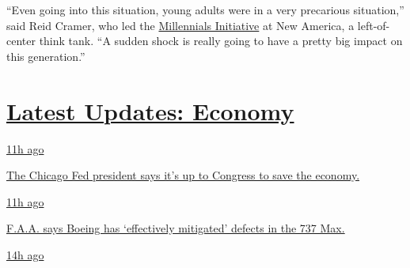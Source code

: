 ``Even going into this situation, young adults were in a very precarious
situation,'' said Reid Cramer, who led the
\href{https://www.newamerica.org/millennials/reports/emerging-millennial-wealth-gap/the-emerging-millennial-wealth-gap-opening-note/}{Millennials
Initiative} at New America, a left-of-center think tank. ``A sudden
shock is really going to have a pretty big impact on this generation.''

\hypertarget{latest-updates-economy}{%
\section{\texorpdfstring{\href{https://www.nytimes3xbfgragh.onion/live/2020/08/03/business/stock-market-today-coronavirus?action=click\&pgtype=Article\&state=default\&region=MAIN_CONTENT_1\&context=storylines_live_updates}{Latest
Updates:
Economy}}{Latest Updates: Economy}}\label{latest-updates-economy}}

\href{https://www.nytimes3xbfgragh.onion/live/2020/08/03/business/stock-market-today-coronavirus?action=click\&pgtype=Article\&state=default\&region=MAIN_CONTENT_1\&context=storylines_live_updates\#the-chicago-fed-president-says-its-up-to-congress-to-save-the-economy}{11h
ago}

\href{https://www.nytimes3xbfgragh.onion/live/2020/08/03/business/stock-market-today-coronavirus?action=click\&pgtype=Article\&state=default\&region=MAIN_CONTENT_1\&context=storylines_live_updates\#the-chicago-fed-president-says-its-up-to-congress-to-save-the-economy}{The
Chicago Fed president says it's up to Congress to save the economy.}

\href{https://www.nytimes3xbfgragh.onion/live/2020/08/03/business/stock-market-today-coronavirus?action=click\&pgtype=Article\&state=default\&region=MAIN_CONTENT_1\&context=storylines_live_updates\#faa-says-boeing-has-effectively-mitigated-defects-in-the-737-max}{11h
ago}

\href{https://www.nytimes3xbfgragh.onion/live/2020/08/03/business/stock-market-today-coronavirus?action=click\&pgtype=Article\&state=default\&region=MAIN_CONTENT_1\&context=storylines_live_updates\#faa-says-boeing-has-effectively-mitigated-defects-in-the-737-max}{F.A.A.
says Boeing has `effectively mitigated' defects in the 737 Max.}

\href{https://www.nytimes3xbfgragh.onion/live/2020/08/03/business/stock-market-today-coronavirus?action=click\&pgtype=Article\&state=default\&region=MAIN_CONTENT_1\&context=storylines_live_updates\#small-businesses-got-emergency-loans-but-not-what-they-expected}{14h
ago}

